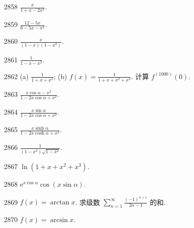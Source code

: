 \begin{prob}[S]{2858}
$\frac{x}{1+x-2x^2}$.
\end{prob}

\begin{prob}[S]{2859}
$\frac{12-5x}{6-5x-x^2}$.
\end{prob}

\begin{prob}[S]{2860}
$\frac{x}{(1-x)(1-x^2)}$.
\end{prob}

\begin{prob}[S]{2861}
$\frac{1}{1-x-x^2}$.
\end{prob}

\begin{prob}[M]{2862}
(a) $\frac{1}{1+x+x^2}$; \qquad (b) $f(x) = \frac{1}{1+x+x^2+x^3}$. 计算 $f^{(1000)}(0)$.
\end{prob}

\begin{prob}[S]{2863}
$\frac{x\cos\alpha - x^2}{1 - 2x\cos\alpha + x^2}$.
\end{prob}

\begin{prob}[S]{2864}
$\frac{x\sin\alpha}{1 - 2x\cos\alpha + x^2}$.
\end{prob}

\begin{prob}[S]{2865}
$\frac{x\sinh\alpha}{1 - 2x\cosh\alpha + x^2}$.
\end{prob}

\begin{prob}[S]{2866}
$\frac{1}{(1-x^2)\sqrt{1-x^2}}$.
\end{prob}

\begin{prob}[S]{2867}
$\ln(1+x+x^2+x^3)$.
\end{prob}

\begin{prob}[S]{2868}
$\mathrm{e}^{x\cos\alpha}\cos(x\sin\alpha)$. 
\end{prob}


\begin{prob}[M]{2869}
$f(x) = \arctan x$. 求级数 $\displaystyle\sum_{n=1}^{\infty} \frac{(-1)^{n+1}}{2n-1}$ 的和.
\end{prob}

\begin{prob}[S]{2870}
$f(x) = \arcsin x$.
\end{prob}

